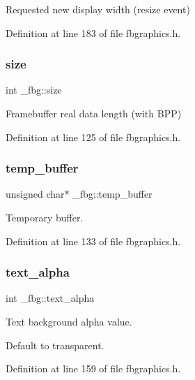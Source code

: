 Requested new display width (resize event) 



Definition at line 183 of file fbgraphics.\+h.

\mbox{\label{struct__fbg_a84fb220d4804cba22176997898e75b73}} 
\subsubsection{\texorpdfstring{size}{size}}
{\footnotesize\ttfamily int \+\_\+fbg\+::size}



Framebuffer real data length (with B\+PP) 



Definition at line 125 of file fbgraphics.\+h.

\mbox{\label{struct__fbg_a0463af9bf583afe770b822c1fbb9a24d}} 
\subsubsection{\texorpdfstring{temp\+\_\+buffer}{temp\_buffer}}
{\footnotesize\ttfamily unsigned char$\ast$ \+\_\+fbg\+::temp\+\_\+buffer}



Temporary buffer. 



Definition at line 133 of file fbgraphics.\+h.

\mbox{\label{struct__fbg_a870987786121c51135f20b630d731abd}} 
\subsubsection{\texorpdfstring{text\+\_\+alpha}{text\_alpha}}
{\footnotesize\ttfamily int \+\_\+fbg\+::text\+\_\+alpha}



Text background alpha value. 

Default to transparent. 

Definition at line 159 of file fbgraphics.\+h.

